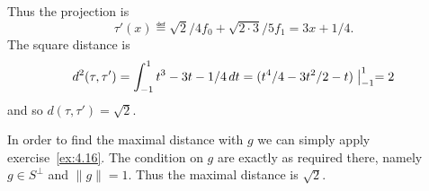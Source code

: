 \begin{enumerate}
\iffalse
\begin{eqnarray*}
\langle \tau, f_0\rangle &=&
  \int_{-1}^1 t^3\cdot \sqrt{2}/2\,dt \\
  &=& (\sqrt{2}/2)\left( (1/4)t^4 \bigm|_{-1}^1 \right) \\
  &=& (\sqrt{2}/2)\cdot(1/4)\cdot 2  \\
  &=& \sqrt{2}/4 \\
\langle \tau, f_1\rangle &=&
  \int_{-1}^1 t^3\cdot \sqrt{3/2}t,dt \\
 &=&  \sqrt{3/2} \left( (1/5)t^5 \bigm|_{-1}^1 \right) \\
 &=&  \sqrt{2\cdot3}/5 \\
\langle \tau, f_2\rangle
 &=&  \int_{-1}^1 t^3\cdot (t^2 - 1/3)\,dt \\
 &=&  (t^6/6 - t^4/12)\bigm|_{-1}^1 \\
 &=&  0
\end{eqnarray*}
\fi

Thus the projection is
\begin{equation*}
\tau'(x) \eqdef \sqrt{2}/4 f_0 + \sqrt{2\cdot3}/5 f_1
 = 3 x + 1/4.
\end{equation*}
The square distance is
\begin{equation*}
d^2(\tau,\tau')
 = \int_{-1}^1 t^3 - 3t - 1/4\,dt
 = (t^4/4 - 3t^2/2 - t) \bigm|_{-1}^1
 = 2
\end{equation*}
and so \(d(\tau,\tau') = \sqrt{2}\).

In order to find the maximal distance with $g$
we can simply apply exercise~\ref{ex:4.16}.
The condition on $g$
are exactly as required
there, namely \(g\in S^\perp\) and \(\|g\|=1\).
Thus the maximal distance is \(\sqrt{2}\).

\iffalse
We put
\begin{equation*}
\tilde{g}(x) \eqdef \tau(x) - \tau'(x) = x^3 - 3 x - 1/4
\end{equation*}
then \(\tilde{g} \in S^\perp\).
To normalize, we compute the norm
\begin{eqnarray*}
\|\tilde{g}\|^2
 &=& \int_{-1}^1 (t^3 - 3 t - 1/4)^2\,dt \\
 &=& \int_{-1}^1
      t^6   - 6t^4   - 2t^3  + 9 t^2 + 3t/2   + 1/16 \,dt \\
 &=& (t^7/7 - 6t^5/5 - t^4/2 + 3 t^3 + 3t^2/4 + t/16) \bigm|{-1}^1 \\
 &=& (t^4/2 + 3t^2/4) \bigm|{-1}^1 \\
 &=& 2(1 + 3/4) \\
 &=& 7/2 \\
\end{eqnarray*}
Finally we define $g$
\begin{eqnarray*}
g(x)
  \eqdef \tilde{g}(x)/\|\tilde{g}\|
  = \sqrt{7/2}t^3 - 3\sqrt{7/2}t - \sqrt{2\cdot 7}/8
\end{eqnarray*}
\fi



\end{enumerate}
